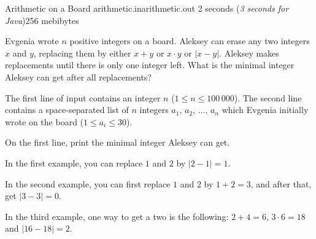 \gdef\thisproblemauthor{Ivan Kazmenko}
\gdef\thisproblemdeveloper{Ivan Kazmenko}
\begin{problem}{Arithmetic on a Board}
{arithmetic.in}{arithmetic.out}
{2 seconds (\textsl{3 seconds for Java})}{256 mebibytes}{}

Evgenia wrote $n$ positive integers on a board.
Aleksey can erase any two integers $x$ and $y$, replacing them
by either $x + y$ or $x \cdot y$ or $|x - y|$.
Aleksey makes replacements until there is only one integer left.
What is the minimal integer Aleksey can get after all replacements?

\InputFile

The first line of input contains an integer $n$
($1 \le n \le 100\,000$).
The second line contains a space-separated list of $n$ integers
$a_1$, $a_2$, $\ldots$, $a_n$ which Evgenia initially wrote on the board
($1 \le a_i \le 30$).

\OutputFile

On the first line, print the minimal integer Aleksey can get.

\Examples

\begin{example}
%
%
%
\end{example}

\Explanations

In the first example, you can replace $1$ and $2$ by $|2 - 1| = 1$.

In the second example, you can first replace $1$ and $2$ by $1 + 2 = 3$,
and after that, get $|3 - 3| = 0$.

In the third example, one way to get a two is the following:
$2 + 4 = 6$, $3 \cdot 6 = 18$ and $|16 - 18| = 2$.

\end{problem}
